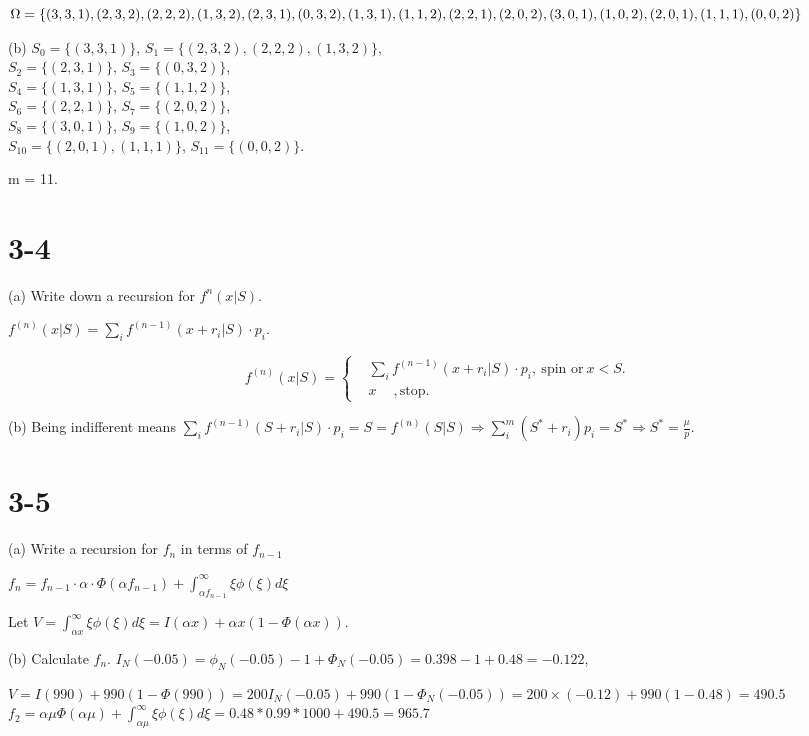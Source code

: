 \documentclass[UTF8]{article}
\begin{document}
$\Omega =\{(3,3,1),(2,3,2),(2,2,2),(1,3,2),(2,3,1),(0,3,2),(1,3,1),\\(1,1,2),(2,2,1),(2,0,2),(3,0,1),(1,0,2),(2,0,1),(1,1,1),(0,0,2)\}$

(b) $S_0 = \{(3,3,1)\}$, $S_1 = \{(2,3,2),(2,2,2),(1,3,2)\}$,\\
$S_2 = \{(2,3,1)\}$, $S_3 = \{(0,3,2)\}$,\\
$S_4 = \{(1,3,1)\}$, $S_5 = \{(1,1,2)\}$,\\
$S_6 = \{(2,2,1)\}$, $S_7 = \{(2,0,2)\}$,\\
$S_8 = \{(3,0,1)\}$, $S_9 = \{(1,0,2)\}$, \\
$S_{10} = \{(2,0,1),(1,1,1)\}$, $S_{11} = \{(0,0,2)\}$.

m = 11.

\section*{3-4}
(a) Write down a recursion for $f^n(x|S)$.

 $f^{(n)}(x|S)= \sum_{i} f^{(n-1)}(x+r_i|S)\cdot p_i$.

 $$ f^{(n)}(x|S)=\left\{
 \begin{aligned}
 & \sum_{i} f^{(n-1)}(x+r_i|S)\cdot p_i,~ \text{spin or}~ x<S.  \\
 & x ~\quad, \text{stop}.
 \end{aligned}
 \right.
 $$

 (b) Being indifferent means $\sum_{i} f^{(n-1)}(S+r_i|S)\cdot p_i = S = f^{(n)}(S|S) \Rightarrow \sum_i^m(S^*+r_i)p_i = S^* \Rightarrow S^* = \frac{\mu}{p}$.

\section*{3-5}
(a) Write a recursion for $f_n$ in terms of $f_{n-1}$

$f_n = f_{n-1} \cdot \alpha \cdot \Phi(\alpha f_{n-1})+ \int_{\alpha f_{n-1}}^{\infty}\xi \phi(\xi) d \xi$

Let $V = \int_{\alpha x}^{\infty}\xi \phi(\xi) d\xi = I(\alpha x) + \alpha x (1-\Phi(\alpha x))$.

(b) Calculate $f_n$.
$I_N(-0.05) = \phi_N(-0.05) -1 + \Phi_N(-0.05) = 0.398 -1 + 0.48 = -0.122$,

$V = I(990) + 990(1-\Phi(990)) = 200I_N(-0.05) + 990(1-\Phi_N(-0.05)) = 200\times(-0.12) + 990(1-0.48)= 490.5 $\\
$f_2 = \alpha\mu \Phi(\alpha \mu) + \int_{\alpha \mu}^{\infty}\xi \phi(\xi) d \xi = 0.48*0.99*1000 + 490.5 = 965.7$
\end{document}
